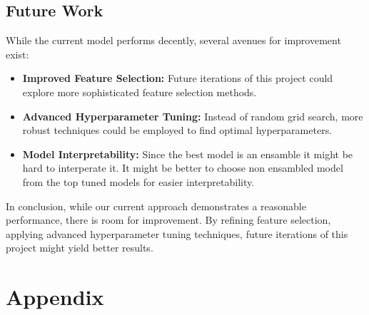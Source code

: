 \documentclass[a4paper,12pt]{article}
\begin{document}
\subsection{Future Work}

While the current model performs decently, several avenues for improvement exist:
\begin{itemize}
    \item \textbf{Improved Feature Selection:} Future iterations of this project could explore more sophisticated feature selection methods.
    \item \textbf{Advanced Hyperparameter Tuning:} Instead of random grid search, more robust techniques could be employed to find optimal hyperparameters.
    \item \textbf{Model Interpretability:} Since the best model is an ensamble it might be hard to interperate it. It might be better to choose non ensambled model from the top tuned models for easier interpretability.
\end{itemize}

In conclusion, while our current approach demonstrates a reasonable performance, there is room for improvement. 
By refining feature selection, applying advanced hyperparameter tuning techniques, future iterations of this project might yield better results.


\clearpage

\appendix
\section*{Appendix}
\end{document}
